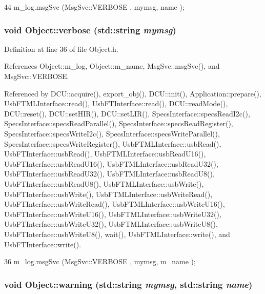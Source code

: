 \begin{DoxyCode}
44 { m_log.msgSvc (MsgSvc::VERBOSE , mymsg, name ); }
\end{DoxyCode}
\hypertarget{classObject_a83d2db2df682907ea1115ad721c1c4a1}{
\subsubsection[{verbose}]{\setlength{\rightskip}{0pt plus 5cm}void Object::verbose (std::string {\em mymsg})}}
\label{classObject_a83d2db2df682907ea1115ad721c1c4a1}


Definition at line 36 of file Object.h.

References Object::m\_\-log, Object::m\_\-name, MsgSvc::msgSvc(), and MsgSvc::VERBOSE.

Referenced by DCU::acquire(), export\_\-obj(), DCU::init(), Application::prepare(), UsbFTMLInterface::read(), UsbFTInterface::read(), DCU::readMode(), DCU::reset(), DCU::setHIR(), DCU::setLIR(), SpecsInterface::specsReadI2c(), SpecsInterface::specsReadParallel(), SpecsInterface::specsReadRegister(), SpecsInterface::specsWriteI2c(), SpecsInterface::specsWriteParallel(), SpecsInterface::specsWriteRegister(), UsbFTMLInterface::usbRead(), UsbFTInterface::usbRead(), UsbFTMLInterface::usbReadU16(), UsbFTInterface::usbReadU16(), UsbFTMLInterface::usbReadU32(), UsbFTInterface::usbReadU32(), UsbFTMLInterface::usbReadU8(), UsbFTInterface::usbReadU8(), UsbFTMLInterface::usbWrite(), UsbFTInterface::usbWrite(), UsbFTMLInterface::usbWriteRead(), UsbFTInterface::usbWriteRead(), UsbFTMLInterface::usbWriteU16(), UsbFTInterface::usbWriteU16(), UsbFTMLInterface::usbWriteU32(), UsbFTInterface::usbWriteU32(), UsbFTMLInterface::usbWriteU8(), UsbFTInterface::usbWriteU8(), wait(), UsbFTMLInterface::write(), and UsbFTInterface::write().


\begin{DoxyCode}
36 { m_log.msgSvc (MsgSvc::VERBOSE , mymsg, m_name ); }
\end{DoxyCode}
\hypertarget{classObject_a11f101db4dd73d9391b0231818881d86}{
\subsubsection[{warning}]{\setlength{\rightskip}{0pt plus 5cm}void Object::warning (std::string {\em mymsg}, \/  std::string {\em name})}}
\label{classObject_a11f101db4dd73d9391b0231818881d86}


